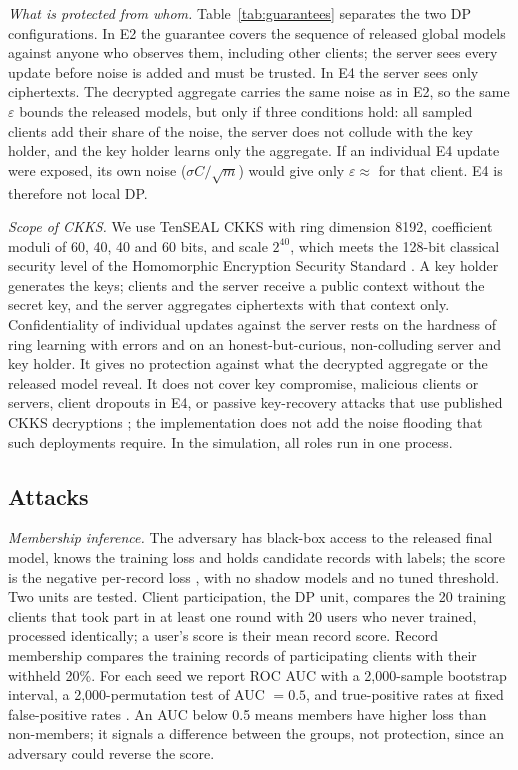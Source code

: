 \documentclass[11pt,a4paper]{article}
\begin{document}
\textit{What is protected from whom.} Table~\ref{tab:guarantees} separates the two DP configurations. In E2 the guarantee covers the sequence of released global models against anyone who observes them, including other clients; the server sees every update before noise is added and must be trusted. In E4 the server sees only ciphertexts. The decrypted aggregate carries the same noise as in E2, so the same $\varepsilon$ bounds the released models, but only if three conditions hold: all sampled clients add their share of the noise, the server does not collude with the key holder, and the key holder learns only the aggregate. If an individual E4 update were exposed, its own noise ($\sigma C/\sqrt m$) would give only $\varepsilon \approx$  for that client. E4 is therefore not local DP.

\textit{Scope of CKKS.} We use TenSEAL CKKS with ring dimension 8192, coefficient moduli of 60, 40, 40 and 60 bits, and scale $2^{40}$, which meets the 128-bit classical security level of the Homomorphic Encryption Security Standard \cite{albrecht2018homomorphic}. A key holder generates the keys; clients and the server receive a public context without the secret key, and the server aggregates ciphertexts with that context only. Confidentiality of individual updates against the server rests on the hardness of ring learning with errors and on an honest-but-curious, non-colluding server and key holder. It gives no protection against what the decrypted aggregate or the released model reveal. It does not cover key compromise, malicious clients or servers, client dropouts in E4, or passive key-recovery attacks that use published CKKS decryptions \cite{li2021security}; the implementation does not add the noise flooding that such deployments require. In the simulation, all roles run in one process.

\subsection{Attacks}

\textit{Membership inference.} The adversary has black-box access to the released final model, knows the training loss and holds candidate records with labels; the score is the negative per-record loss \cite{yeom2018privacy}, with no shadow models and no tuned threshold. Two units are tested. Client participation, the DP unit, compares the 20 training clients that took part in at least one round with 20 users who never trained, processed identically; a user's score is their mean record score. Record membership compares the training records of participating clients with their withheld 20\%. For each seed we report ROC AUC with a 2,000-sample bootstrap interval, a 2,000-permutation test of AUC $=0.5$, and true-positive rates at fixed false-positive rates \cite{carlini2022membership}. An AUC below 0.5 means members have higher loss than non-members; it signals a difference between the groups, not protection, since an adversary could reverse the score.
\end{document}
